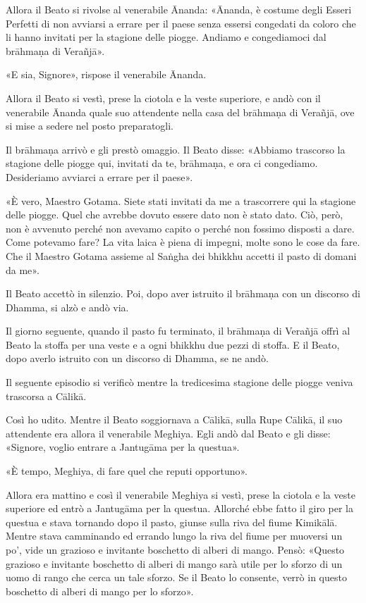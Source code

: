 Allora il Beato si rivolse al venerabile Ānanda: «Ānanda, è costume degli Esseri
Perfetti di non avviarsi a errare per il paese senza essersi congedati da coloro
che li hanno invitati per la stagione delle piogge. Andiamo e congediamoci dal
brāhmaṇa di Verañjā».

«E sia, Signore», rispose il venerabile Ānanda.

Allora il Beato si vestì, prese la ciotola e la veste superiore, e andò con il
venerabile Ānanda quale suo attendente nella casa del brāhmaṇa di Verañjā, ove
si mise a sedere nel posto preparatogli.

Il brāhmaṇa arrivò e gli prestò omaggio. Il Beato disse: «Abbiamo trascorso la
stagione delle piogge qui, invitati da te, brāhmaṇa, e ora ci congediamo.
Desideriamo avviarci a errare per il paese».

«È vero, Maestro Gotama. Siete stati invitati da me a trascorrere qui la
stagione delle piogge. Quel che avrebbe dovuto essere dato non è stato dato.
Ciò, però, non è avvenuto perché non avevamo capito o perché non fossimo
disposti a dare. Come potevamo fare? La vita laica è piena di impegni, molte
sono le cose da fare. Che il Maestro Gotama assieme al Saṅgha dei bhikkhu
accetti il pasto di domani da me».

Il Beato accettò in silenzio. Poi, dopo aver istruito il brāhmaṇa con un
discorso di Dhamma, si alzò e andò via.

Il giorno seguente, quando il pasto fu terminato, il brāhmaṇa di Verañjā offrì
al Beato la stoffa per una veste e a ogni bhikkhu due pezzi di stoffa. E il
Beato, dopo averlo istruito con un discorso di Dhamma, se ne andò.


 Il seguente episodio si verificò mentre la
tredicesima stagione delle piogge veniva trascorsa a Cālikā.

 Così ho udito. Mentre il Beato soggiornava a Cālikā, sulla
Rupe Cālikā, il suo attendente era allora il venerabile Meghiya. Egli andò dal
Beato e gli disse: «Signore, voglio entrare a Jantugāma per la questua».

«È tempo, Meghiya, di fare quel che reputi opportuno».

Allora era mattino e così il venerabile Meghiya si vestì, prese la ciotola e la
veste superiore ed entrò a Jantugāma per la questua. Allorché ebbe fatto il giro
per la questua e stava tornando dopo il pasto, giunse sulla riva del fiume
Kimikālā. Mentre stava camminando ed errando lungo la riva del fiume per
muoversi un po’, vide un grazioso e invitante boschetto di alberi di mango.
Pensò: «Questo grazioso e invitante boschetto di alberi di mango sarà utile per
lo sforzo di un uomo di rango che cerca un tale sforzo. Se il Beato lo consente,
verrò in questo boschetto di alberi di mango per lo sforzo».

